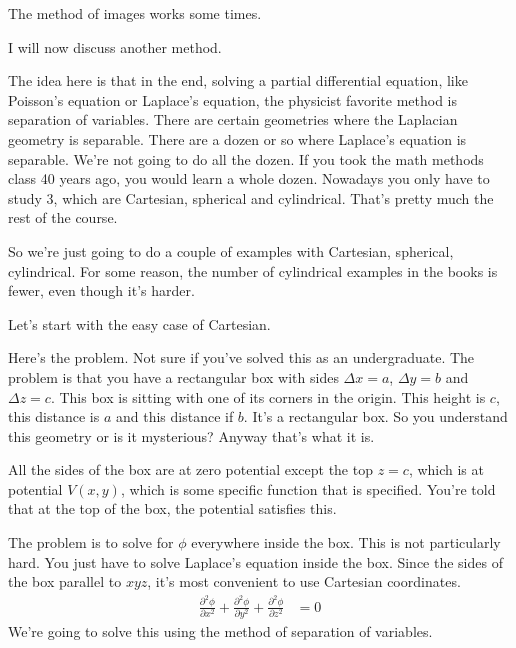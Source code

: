 The method of images works some times.

I will now discuss another method.

The idea here is that in the end,
solving a partial differential equation,
like Poisson's equation or Laplace's equation,
the physicist favorite method is separation of variables.
There are certain geometries where the Laplacian geometry is separable.
There are a dozen or so where Laplace's equation is separable.
We're not going to do all the dozen.
If you took the math methods class 40 years ago,
you would learn a whole dozen.
Nowadays you only have to study 3,
which are Cartesian, spherical and cylindrical.
That's pretty much the rest of the course.

So we're just going to do a couple of examples with Cartesian,
spherical, cylindrical.
For some reason,
the number of cylindrical examples in the books is fewer,
even though it's harder.

Let's start with the easy case of Cartesian.

Here's the problem.
Not sure if you've solved this as an undergraduate.
The problem is that you have a rectangular box
with sides $\Delta x = a$,
$\Delta y = b$ and $\Delta z = c$.
This box is sitting with one of its corners in the origin.
This height is $c$,
this distance is $a$ and this distance if $b$.
It's a rectangular box.
So you understand this geometry or is it mysterious?
Anyway that's what it is.

All the sides of the box are at zero potential except the top
$z=c$,
which is at potential $V(x, y)$,
which is some specific function that is specified.
You're told that at the top of the box,
the potential satisfies this.

The problem is to solve for $\phi$ everywhere inside the box.
This is not particularly hard.
You just have to solve Laplace's equation inside the box.
Since the sides of the box parallel to $xyz$,
it's most convenient to use Cartesian coordinates.
\begin{align}
    \frac{\partial^2 \phi}{\partial x^2}
    +
    \frac{\partial^2 \phi}{\partial y^2}
    +
    \frac{\partial^2 \phi}{\partial z^2}
    &=
    0
\end{align}
We're going to solve this using the method of separation of variables.

